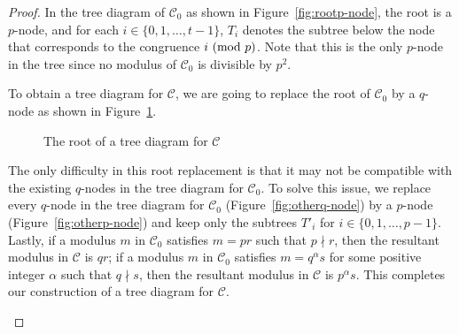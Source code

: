 \documentclass[12pt]{article}
\theoremstyle{definition}
\renewcommand{\i}{\textup{\textbf{i}}}
\renewcommand{\j}{\textup{\textbf{j}}}
\newcommand{\q}{\textup{\textbf{q}}}
\renewcommand{\mod}[2]{#1\textup{ (mod }#2\textup{)}}
\begin{document}
\begin{proof}
In the tree diagram of $\mathcal{C}_0$ as shown in Figure~\ref{fig:rootp-node}, the root is a $p$-node, and for each $i\in\{0,1,\dotsc,t-1\}$, $T_i$ denotes the subtree below the node that corresponds to the congruence $\mod{i}{p}$. Note that this is the only $p$-node in the tree since no modulus of $\mathcal{C}_0$ is divisible by $p^2$.

To obtain a tree diagram for $\mathcal{C}$, we are going to replace the root of $\mathcal{C}_0$ by a $q$-node as shown in Figure~\ref{fig:rootq-node}.
\begin{figure}[H]
\centering
{}
\caption{The root of a tree diagram for $\mathcal{C}$}
\label{fig:rootq-node}
\end{figure}
\noindent The only difficulty in this root replacement is that it may not be compatible with the existing $q$-nodes in the tree diagram for $\mathcal{C}_0$. To solve this issue, we replace every $q$-node in the tree diagram for $\mathcal{C}_0$ (Figure~\ref{fig:otherq-node}) by a $p$-node (Figure~\ref{fig:otherp-node}) and keep only the subtrees $T'_i$ for $i\in\{0,1,\dotsc,p-1\}$. Lastly, if a modulus $m$ in $\mathcal{C}_0$ satisfies $m=pr$ such that $p\nmid r$, then the resultant modulus in $\mathcal{C}$ is $qr$; if a modulus $m$ in $\mathcal{C}_0$ satisfies $m=q^\alpha s$ for some positive integer $\alpha$ such that $q\nmid s$, then the resultant modulus in $\mathcal{C}$ is $p^\alpha s$. This completes our construction of a tree diagram for $\mathcal{C}$.
\begin{figure}[H]
\centering
{}

\end{figure}
\end{proof}
\end{document}
